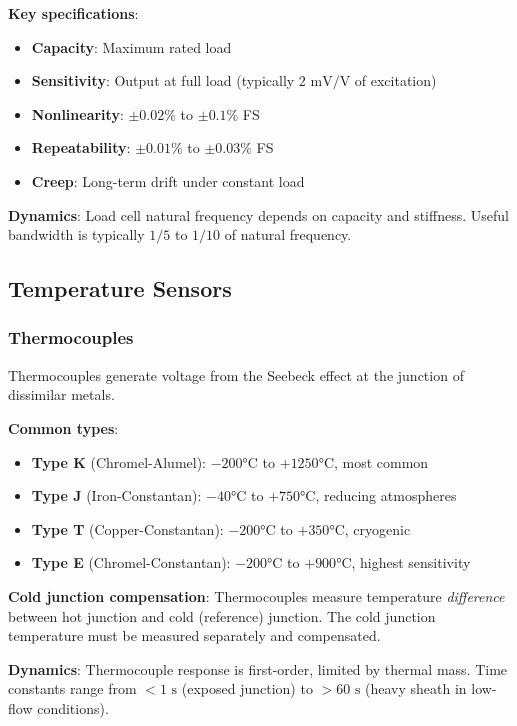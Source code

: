 \textbf{Key specifications}:
\begin{itemize}
    \item \textbf{Capacity}: Maximum rated load
    \item \textbf{Sensitivity}: Output at full load (typically $2\text{ mV/V}$ of excitation)
    \item \textbf{Nonlinearity}: $\pm 0.02\%$ to $\pm 0.1\%$ FS
    \item \textbf{Repeatability}: $\pm 0.01\%$ to $\pm 0.03\%$ FS
    \item \textbf{Creep}: Long-term drift under constant load
\end{itemize}

\textbf{Dynamics}: Load cell natural frequency depends on capacity and stiffness. Useful bandwidth is typically $1/5$ to $1/10$ of natural frequency.

\subsection{Temperature Sensors}

\subsubsection{Thermocouples}

Thermocouples generate voltage from the Seebeck effect at the junction of dissimilar metals.

\textbf{Common types}:
\begin{itemize}
    \item \textbf{Type K} (Chromel-Alumel): $-200°\text{C}$ to $+1250°\text{C}$, most common
    \item \textbf{Type J} (Iron-Constantan): $-40°\text{C}$ to $+750°\text{C}$, reducing atmospheres
    \item \textbf{Type T} (Copper-Constantan): $-200°\text{C}$ to $+350°\text{C}$, cryogenic
    \item \textbf{Type E} (Chromel-Constantan): $-200°\text{C}$ to $+900°\text{C}$, highest sensitivity
\end{itemize}

\textbf{Cold junction compensation}: Thermocouples measure temperature \textit{difference} between hot junction and cold (reference) junction. The cold junction temperature must be measured separately and compensated.

\textbf{Dynamics}: Thermocouple response is first-order, limited by thermal mass. Time constants range from $<1\text{ s}$ (exposed junction) to $>60\text{ s}$ (heavy sheath in low-flow conditions).

